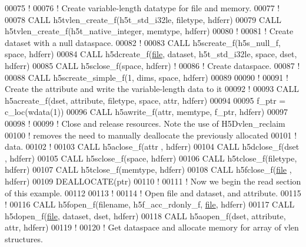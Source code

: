\begin{DoxyCode}
00075   \textcolor{comment}{!}
00076   \textcolor{comment}{! Create variable-length datatype for file and memory.}
00077   \textcolor{comment}{!}
00078   \textcolor{keyword}{CALL }h5tvlen\_create\_f(h5t\_std\_i32le, filetype, hdferr)
00079   \textcolor{keyword}{CALL }h5tvlen\_create\_f(h5t\_native\_integer, memtype, hdferr)
00080   \textcolor{comment}{!}
00081   \textcolor{comment}{! Create dataset with a null dataspace.}
00082   \textcolor{comment}{!}
00083   \textcolor{keyword}{CALL }h5screate\_f(h5s\_null\_f, space, hdferr)
00084   \textcolor{keyword}{CALL }h5dcreate\_f(\hyperlink{structfile}{file}, dataset, h5t\_std\_i32le, space, dset, hdferr)
00085   \textcolor{keyword}{CALL }h5sclose\_f(space, hdferr)  \textcolor{comment}{!}
00086   \textcolor{comment}{! Create dataspace.}
00087   \textcolor{comment}{!}
00088   \textcolor{keyword}{CALL }h5screate\_simple\_f(1, dims, space, hdferr)
00089 
00090   \textcolor{comment}{!}
00091   \textcolor{comment}{! Create the attribute and write the variable-length data to it}
00092   \textcolor{comment}{!}
00093   \textcolor{keyword}{CALL }h5acreate\_f(dset, attribute, filetype, space, attr, hdferr)
00094 
00095   f\_ptr = c\_loc(wdata(1))
00096   \textcolor{keyword}{CALL }h5awrite\_f(attr, memtype, f\_ptr, hdferr)
00097 
00098   \textcolor{comment}{!}
00099   \textcolor{comment}{! Close and release resources.  Note the use of H5Dvlen\_reclaim}
00100   \textcolor{comment}{! removes the need to manually deallocate the previously allocated}
00101   \textcolor{comment}{! data.}
00102   \textcolor{comment}{!}
00103   \textcolor{keyword}{CALL }h5aclose\_f(attr , hdferr)
00104   \textcolor{keyword}{CALL }h5dclose\_f(dset , hdferr)
00105   \textcolor{keyword}{CALL }h5sclose\_f(space, hdferr)
00106   \textcolor{keyword}{CALL }h5tclose\_f(filetype, hdferr)
00107   \textcolor{keyword}{CALL }h5tclose\_f(memtype, hdferr)
00108   \textcolor{keyword}{CALL }h5fclose\_f(\hyperlink{structfile}{file} , hdferr)
00109   \textcolor{keyword}{DEALLOCATE}(ptr)
00110   \textcolor{comment}{!}
00111   \textcolor{comment}{! Now we begin the read section of this example.}
00112 
00113   \textcolor{comment}{!}
00114   \textcolor{comment}{! Open file and dataset, and attribute.}
00115   \textcolor{comment}{!}
00116   \textcolor{keyword}{CALL }h5fopen\_f(filename, h5f\_acc\_rdonly\_f, \hyperlink{structfile}{file}, hdferr)
00117   \textcolor{keyword}{CALL }h5dopen\_f(\hyperlink{structfile}{file}, dataset, dset, hdferr)
00118   \textcolor{keyword}{CALL }h5aopen\_f(dset, attribute, attr, hdferr)
00119   \textcolor{comment}{!}
00120   \textcolor{comment}{! Get dataspace and allocate memory for array of vlen structures.}

\end{DoxyCode}
